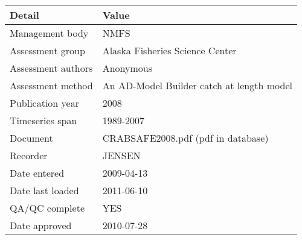 \begin{table}[htb]
\centering
\begin{tabular}{lp{7cm}}
\toprule
Detail & Value \\
\midrule
Management body    & NMFS                                      \\
Assessment group   & Alaska Fisheries Science Center           \\
Assessment authors & Anonymous                                 \\
Assessment method  & An AD-Model Builder catch at length model \\
Publication year   & 2008                                      \\
Timeseries span    & 1989-2007                                 \\
Document           & CRABSAFE2008.pdf (pdf in database)        \\
Recorder           & JENSEN                                    \\
Date entered       & 2009-04-13                                \\
Date last loaded   & 2011-06-10                                \\
QA/QC complete     & YES                                       \\
Date approved      & 2010-07-28                                \\
\bottomrule
\end{tabular}
\label{tab:assessdet}
\end{table}
